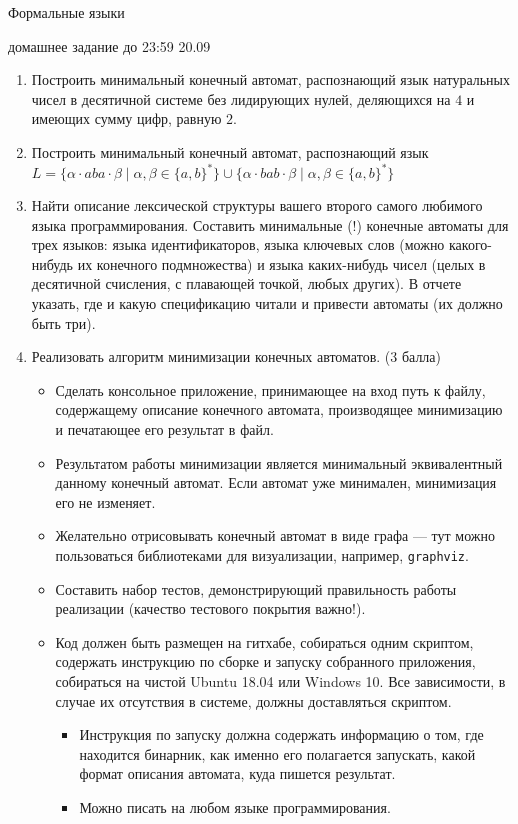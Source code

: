 \documentclass{article}
\begin{document}
\begin{center} {\LARGE Формальные языки} \end{center}

\begin{center} {\Large домашнее задание до 23:59 20.09} \end{center}
\bigskip

\begin{enumerate}
  \item Построить минимальный конечный автомат, распознающий язык натуральных чисел в десятичной системе без лидирующих нулей, деляющихся на $4$ и имеющих сумму цифр, равную $2$.
  \item Построить минимальный конечный автомат, распознающий язык \\ $ L = \{ \alpha \cdot a b a \cdot \beta \mid \alpha, \beta \in \{ a, b \}^* \} \cup \{ \alpha \cdot b a b \cdot \beta \mid \alpha, \beta \in \{ a, b \}^* \} $
  \item Найти описание лексической структуры вашего второго самого любимого языка программирования. Составить минимальные (!) конечные автоматы для трех языков: языка идентификаторов, языка ключевых слов (можно какого-нибудь их конечного подмножества) и языка каких-нибудь чисел (целых в десятичной счисления, с плавающей точкой, любых других). В отчете указать, где и какую спецификацию читали и привести автоматы (их должно быть три). 
  \item 
  {
    Реализовать алгоритм минимизации конечных автоматов. (3 балла)
        \begin{itemize}
        \item Сделать консольное  приложение, принимающее на вход путь к файлу, содержащему описание конечного автомата, производящее минимизацию и печатающее его результат в файл.
        \item Результатом работы минимизации является минимальный эквивалентный данному конечный автомат. Если автомат уже минимален, минимизация его не изменяет.
        \item Желательно отрисовывать конечный автомат в виде графа --- тут можно пользоваться библиотеками для визуализации, например, \verb!graphviz!.
        \item Составить набор тестов, демонстрирующий правильность работы реализации (качество тестового покрытия важно!).
        \item Код должен быть размещен на гитхабе, собираться одним скриптом, содержать инструкцию по сборке и запуску собранного приложения, собираться на чистой Ubuntu 18.04 или Windows 10. Все зависимости, в случае их отсутствия в системе, должны доставляться скриптом.
        \begin{itemize}
            \item Инструкция по запуску должна содержать информацию о том, где находится бинарник, как именно его полагается запускать, какой формат описания автомата, куда пишется результат.
            \item Можно писать на любом языке программирования. 
        \end{itemize} 
     \end{itemize}
  }
\end{enumerate}
\end{document}
